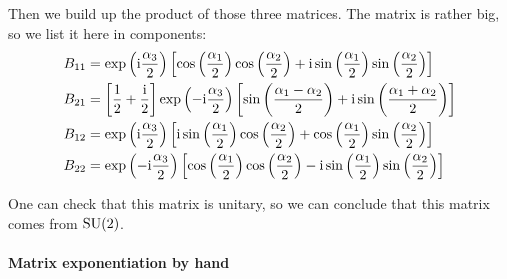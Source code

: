 \documentclass[11pt, english, fleqn, DIV=15, headinclude, BCOR=1cm]{scrartcl}
\begin{document}
Then we build up the product of those three matrices. The matrix is rather
big, so we list it here in components:
\begin{align*}
    B_{11} &= \exp\left( \mathrm i \frac{\alpha_3}2 \right) \left[ \cos\left( \frac{\alpha_1}2 \right) \cos\left( \frac{\alpha_2}2 \right) + \mathrm i \sin\left( \frac{\alpha_1}2 \right) \sin\left( \frac{\alpha_2}2 \right) \right] \\
    B_{21} &= \left[ \frac 12 + \frac{\mathrm i}2 \right] \exp\left( - \mathrm i \frac{\alpha_3}2 \right)
    \left[ \sin\left( \frac{\alpha_1-\alpha_2}2 \right) + \mathrm i \sin\left( \frac{\alpha_1 +
    \alpha_2}2 \right)  \right] \\
    B_{12} &= \exp\left( \mathrm i \frac{\alpha_3}2 \right) \left[ \mathrm i
\sin\left( \frac{\alpha_1}2 \right) \cos\left( \frac{\alpha_2}2 \right) +
\cos\left( \frac{\alpha_1}2 \right) \sin\left( \frac{\alpha_2}2 \right) \right] \\
    B_{22} &= \exp\left( - \mathrm i \frac{\alpha_3}2 \right) \left[ \cos\left( \frac{\alpha_1}2 \right)
\cos\left( \frac{\alpha_2}2 \right) - \mathrm i \sin\left( \frac{\alpha_1}2 \right)
\sin\left( \frac{\alpha_2}2 \right) \right]
\end{align*}

One can check that this matrix is unitary, so we can conclude that this matrix
comes from $\mathrm{SU}(2)$.

\paragraph{Matrix exponentiation by hand}
\end{document}

